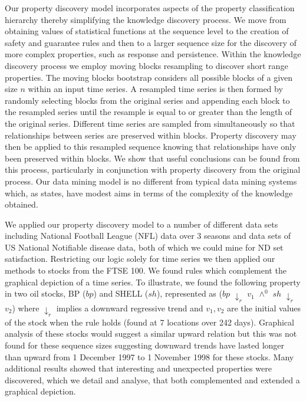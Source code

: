 \medskip


Our property discovery model incorporates aspects of the property
classification hierarchy thereby simplifying the knowledge discovery
process. We move from obtaining values of statistical functions at the
sequence level to the creation of safety and guarantee rules and then
to a larger sequence size for the discovery of more complex
properties, such as response and persistence.
Within the knowledge discovery process we employ moving blocks
resampling to discover short range properties. The moving blocks
bootstrap considers all possible blocks of a given size $n$ within an
input time series. A resampled time series is then formed by randomly
selecting blocks from the original series and appending each block to
the resampled series until the resample is equal to or greater than
the length of the original series.  Different time series are sampled
from simultaneously so that relationships between series are preserved
within blocks. Property discovery may then be
applied to this resampled sequence knowing that relationships have
only been preserved within blocks. We show that useful conclusions can
be found from this process, particularly in conjunction with property
discovery from the original process. Our data mining model is no
different from typical data mining systems which, as \cite{man96}
states, have modest aims in terms of the complexity of the knowledge
obtained. 
\medskip

We applied our property discovery model to a number of different data
sets including National Football League (NFL) data over 3 seasons and data
sets of US National Notifiable disease data, both of which we could
mine for ND set satisfaction. Restricting our logic solely for time
series we then applied our methods to stocks from the FTSE 100. We found
rules which complement the graphical depiction of a time series. To
illustrate, we found the following property in two oil stocks, BP ($bp$) and
SHELL ($sh$), represented as  ($bp$ $\downarrow_r$ $v_1$
$\wedge^0$ $sh$ $\downarrow_r$ $v_2$) where $\downarrow_r$ implies a downward
regressive trend and $v_1,v_2$ are the initial values of the stock
when the rule holds (found at 7 locations over 242 days).  Graphical analysis of these stocks would suggest
a similar upward relation but this was not found for these sequence
sizes suggesting downward trends have lasted longer than upward from 1
December 1997 to 1 November 1998 for these stocks. Many additional results 
showed that interesting and unexpected properties were
discovered, which we detail and analyse, that both complemented and
extended a graphical depiction.

